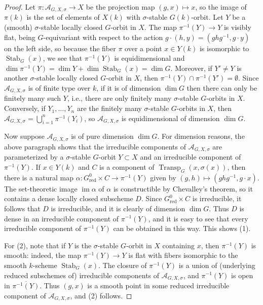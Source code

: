 \documentclass[11pt,reqno]{amsart}
\theoremstyle{definition}
\renewcommand{\rm}{\mathrm}
\newcommand{\sA}{{\mathscr A}}
\DeclareMathOperator{\im}{im}
\DeclareMathOperator{\Stab}{Stab}
\DeclareMathOperator{\Transp}{Transp}
\newcommand{\ov}[1]{\overline{#1}}
\begin{document}
\begin{proof}
    Let $\pi\colon \sA_{G, X, \sigma} \to X$ be the projection map $(g, x) \mapsto x$, so the image of $\pi(k)$ is the set of elements of $X(k)$ with $\sigma$-stable $G(k)$-orbit. Let $Y$ be a (smooth) $\sigma$-stable locally closed $G$-orbit in $X$. The map $\pi^{-1}(Y) \to Y$ is visibly flat, being $G$-equivariant with respect to the action $g \cdot (h, y) = (ghg^{-1}, g \cdot y)$ on the left side, so because the fiber $\pi$ over a point $x \in Y(k)$ is isomorphic to $\Stab_G(x)$, we see that $\pi^{-1}(Y)$ is equidimensional and $\dim \pi^{-1}(Y) = \dim Y + \dim \Stab_G(x) = \dim G$. Moreover, if $Y' \neq Y$ is another $\sigma$-stable locally closed $G$-orbit in $X$, then $\pi^{-1}(Y) \cap \pi^{-1}(Y') = \emptyset$. Since $\sA_{G, X, \sigma}$ is of finite type over $k$, if it is of dimension $\dim G$ then there can only be finitely many such $Y$, i.e., there are only finitely many $\sigma$-stable $G$-orbits in $X$. Conversely, if $Y_1, \dots, Y_n$ are the finitely many $\sigma$-stable $G$-orbits in $X$, then $\sA_{G, X, \sigma} = \bigcup_{i=1}^n \pi^{-1}(Y_i)$, so $\sA_{G, X, \sigma}$ is equidimensional of dimension $\dim G$.

    Now suppose $\sA_{G,X,\sigma}$ is of pure dimension $\dim G$. For dimension reasons, the above paragraph shows that the irreducible components of $\sA_{G, X, \sigma}$ are parameterized by a $\sigma$-stable $G$-orbit $Y \subset X$ and an irreducible component of $\pi^{-1}(Y)$. If $x \in Y(k)$ and $C$ is a component of $\Transp_G(x, \sigma(x))$, then there is a natural map $\alpha\colon G^0_{\rm{red}} \times C \to \pi^{-1}(Y)$ given by $(g, h) \mapsto (ghg^{-1}, g \cdot x)$. The set-theoretic image $\im\alpha$ of $\alpha$ is constructible by Chevalley's theorem, so it contains a dense locally closed subscheme $D$. Since $G^0_{\rm{red}} \times C$ is irreducible, it follows that $D$ is irreducible, and it is clearly of dimension $\dim G$. Thus $D$ is dense in an irreducible component of $\pi^{-1}(Y)$, and it is easy to see that every irreducible component of $\pi^{-1}(Y)$ can be obtained in this way. This shows (1).
    
    For (2), note that if $Y$ is the $\sigma$-stable $G$-orbit in $X$ containing $x$, then $\pi^{-1}(Y)$ is smooth: indeed, the map $\pi^{-1}(Y) \to Y$ is flat with fibers isomorphic to the smooth $k$-scheme $\Stab_G(x)$. The closure of $\pi^{-1}(Y)$ is a union of (underlying reduced subschemes of) irreducible components of $\sA_{G, X, \sigma}$, and $\pi^{-1}(Y)$ is open in $\ov{\pi^{-1}(Y)}$. Thus $(g, x)$ is a smooth point in some reduced irreducible component of $\sA_{G, X, \sigma}$, and (2) follows.
\end{proof}
\end{document}
